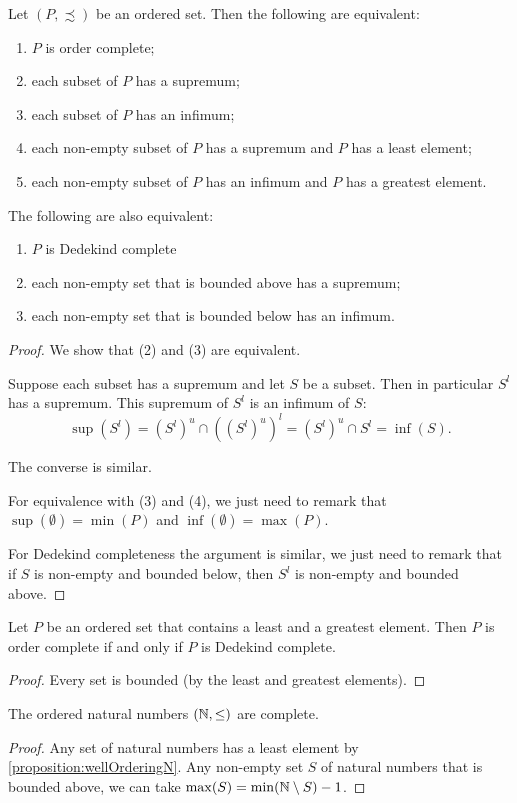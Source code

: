 \begin{proposition} \label{prop:existenceSupremaInfima}
Let $(P,\precsim)$ be an ordered set. Then the following are equivalent:
\begin{enumerate}
\item $P$ is order complete;
\item each subset of $P$ has a supremum;
\item each subset of $P$ has an infimum;
\item each non-empty subset of $P$ has a supremum and $P$ has a least element;
\item each non-empty subset of $P$ has an infimum and $P$ has a greatest element.
\end{enumerate}
The following are also equivalent:
\begin{enumerate}
\item $P$ is Dedekind complete
\item each non-empty set that is bounded above has a supremum;
\item each non-empty set that is bounded below has an infimum.
\end{enumerate}
\end{proposition}
\begin{proof}
We show that (2) and (3) are equivalent.

Suppose each subset has a supremum and let $S$ be a subset. Then in particular $S^l$ has a supremum. This supremum of $S^l$ is an infimum of $S$:
\[ \sup(S^l) = (S^l)^u\cap((S^l)^u)^l = (S^l)^u\cap S^l = \inf(S).  \]

The converse is similar.

For equivalence with (3) and (4), we just need to remark that $\sup(\emptyset) = \min(P)$ and $\inf(\emptyset) = \max(P)$.

For Dedekind completeness the argument is similar, we just need to remark that if $S$ is non-empty and bounded below, then $S^l$ is non-empty and bounded above.
\end{proof}

\begin{lemma}
Let $P$ be an ordered set that contains a least and a greatest element. Then $P$ is order complete \textup{if and only if} $P$ is Dedekind complete.
\end{lemma}
\begin{proof}
Every set is bounded (by the least and greatest elements).
\end{proof}

\begin{lemma}
The ordered natural numbers $\left( \mathbb{N},\leq \right)$ are complete.
\end{lemma}
\begin{proof}
Any set of natural numbers has a least element by \ref{proposition:wellOrderingN}. Any non-empty set $S$ of natural numbers that is bounded above, we can take $\max(S) = \min(\mathbb{N}\setminus S)-1$.
\end{proof}

